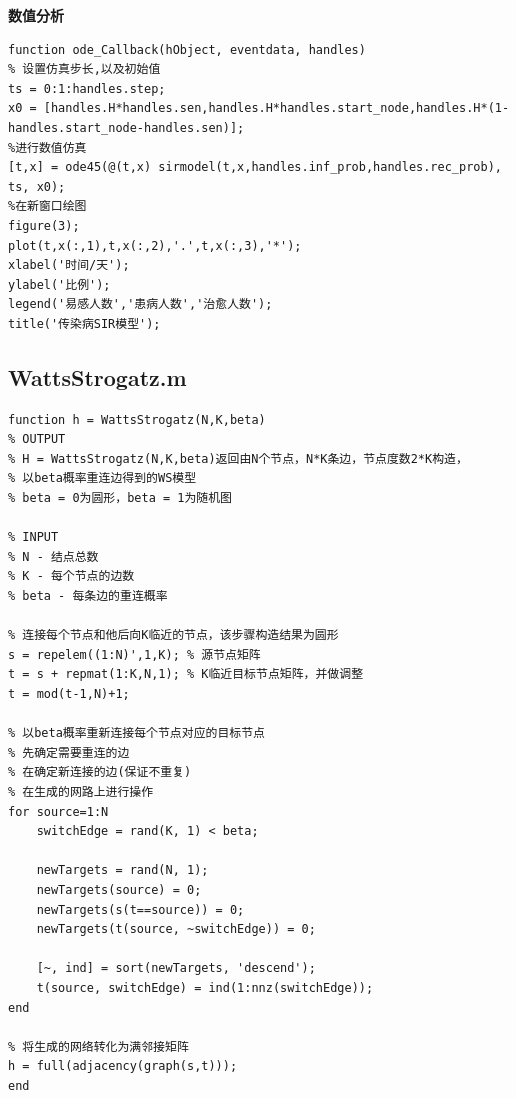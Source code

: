 \documentclass[supercite]{HustGraduPaper}
\begin{document}
	\textbf{数值分析} \par
	\begin{lstlisting}
function ode_Callback(hObject, eventdata, handles)
% 设置仿真步长,以及初始值
ts = 0:1:handles.step;
x0 = [handles.H*handles.sen,handles.H*handles.start_node,handles.H*(1-handles.start_node-handles.sen)];
%进行数值仿真
[t,x] = ode45(@(t,x) sirmodel(t,x,handles.inf_prob,handles.rec_prob), ts, x0);
%在新窗口绘图
figure(3);
plot(t,x(:,1),t,x(:,2),'.',t,x(:,3),'*');
xlabel('时间/天');
ylabel('比例');
legend('易感人数','患病人数','治愈人数');
title('传染病SIR模型');
	\end{lstlisting}

	\subsection{WattsStrogatz.m}
	\begin{lstlisting}
function h = WattsStrogatz(N,K,beta)
% OUTPUT
% H = WattsStrogatz(N,K,beta)返回由N个节点，N*K条边，节点度数2*K构造，
% 以beta概率重连边得到的WS模型
% beta = 0为圆形，beta = 1为随机图

% INPUT
% N - 结点总数
% K - 每个节点的边数
% beta - 每条边的重连概率

% 连接每个节点和他后向K临近的节点，该步骤构造结果为圆形
s = repelem((1:N)',1,K); % 源节点矩阵
t = s + repmat(1:K,N,1); % K临近目标节点矩阵，并做调整
t = mod(t-1,N)+1;

% 以beta概率重新连接每个节点对应的目标节点
% 先确定需要重连的边
% 在确定新连接的边(保证不重复)
% 在生成的网路上进行操作
for source=1:N    
    switchEdge = rand(K, 1) < beta;
    
    newTargets = rand(N, 1);
    newTargets(source) = 0;
    newTargets(s(t==source)) = 0;
    newTargets(t(source, ~switchEdge)) = 0;
    
    [~, ind] = sort(newTargets, 'descend');
    t(source, switchEdge) = ind(1:nnz(switchEdge));
end

% 将生成的网络转化为满邻接矩阵
h = full(adjacency(graph(s,t)));
end
	\end{lstlisting}
\end{document}
